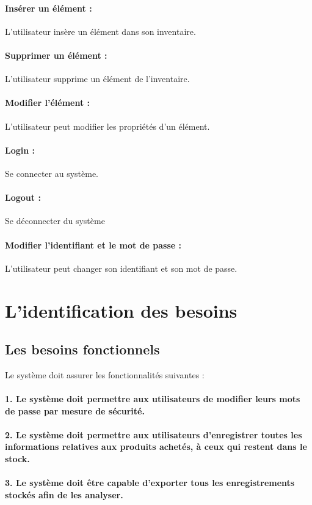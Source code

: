 \paragraph{Insérer un élément :} L'utilisateur insère un élément dans son inventaire.
\paragraph{Supprimer un élément :} L'utilisateur supprime un élément de l'inventaire.
\paragraph{Modifier l'élément :} L'utilisateur peut modifier les propriétés d'un élément.
\paragraph{Login :} Se connecter au système.
\paragraph{Logout :} Se déconnecter du système
\paragraph{Modifier l'identifiant et le mot de passe :} L'utilisateur peut changer son identifiant et son mot de passe.

\section{L’identification des besoins}
\subsection{Les besoins fonctionnels}
Le système doit assurer les fonctionnalités suivantes :

\paragraph{1. Le système doit permettre aux utilisateurs de modifier leurs mots de passe par mesure de sécurité.}
\paragraph{2. Le système doit permettre aux utilisateurs d'enregistrer toutes les informations relatives aux produits achetés, à ceux qui restent dans le stock.}
\paragraph{3. Le système doit être capable d'exporter tous les enregistrements stockés afin de les analyser.}

